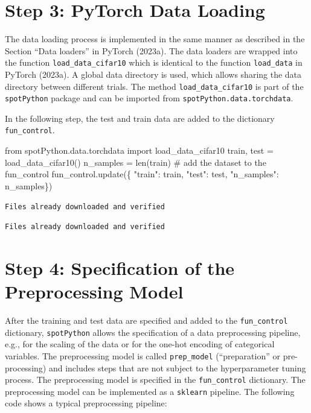 \documentclass[
  letterpaper,
  DIV=11,
  numbers=noendperiod]{scrreprt}
\newenvironment{Shaded}{\begin{snugshade}}{\end{snugshade}}
\newcommand{\BuiltInTok}[1]{\textcolor[rgb]{0.00,0.23,0.31}{#1}}
\newcommand{\CommentTok}[1]{\textcolor[rgb]{0.37,0.37,0.37}{#1}}
\newcommand{\ImportTok}[1]{\textcolor[rgb]{0.00,0.46,0.62}{#1}}
\newcommand{\NormalTok}[1]{\textcolor[rgb]{0.00,0.23,0.31}{#1}}
\newcommand{\OperatorTok}[1]{\textcolor[rgb]{0.37,0.37,0.37}{#1}}
\newcommand{\StringTok}[1]{\textcolor[rgb]{0.13,0.47,0.30}{#1}}
\begin{document}
\hypertarget{sec-data-loading-14}{%
\section{Step 3: PyTorch Data Loading}\label{sec-data-loading-14}}

The data loading process is implemented in the same manner as described
in the Section ``Data loaders'' in PyTorch (2023a). The data loaders are
wrapped into the function \texttt{load\_data\_cifar10} which is
identical to the function \texttt{load\_data} in PyTorch (2023a). A
global data directory is used, which allows sharing the data directory
between different trials. The method \texttt{load\_data\_cifar10} is
part of the \texttt{spotPython} package and can be imported from
\texttt{spotPython.data.torchdata}.

In the following step, the test and train data are added to the
dictionary \texttt{fun\_control}.

\begin{Shaded}
\begin{Highlighting}[]
\ImportTok{from}\NormalTok{ spotPython.data.torchdata }\ImportTok{import}\NormalTok{ load\_data\_cifar10}
\NormalTok{train, test }\OperatorTok{=}\NormalTok{ load\_data\_cifar10()}
\NormalTok{n\_samples }\OperatorTok{=} \BuiltInTok{len}\NormalTok{(train)}
\CommentTok{\# add the dataset to the fun\_control}
\NormalTok{fun\_control.update(\{}
    \StringTok{"train"}\NormalTok{: train,}
    \StringTok{"test"}\NormalTok{: test,}
    \StringTok{"n\_samples"}\NormalTok{: n\_samples\})}
\end{Highlighting}
\end{Shaded}

\begin{verbatim}
Files already downloaded and verified
\end{verbatim}

\begin{verbatim}
Files already downloaded and verified
\end{verbatim}

\hypertarget{sec-specification-of-preprocessing-model-14}{%
\section{Step 4: Specification of the Preprocessing
Model}\label{sec-specification-of-preprocessing-model-14}}

After the training and test data are specified and added to the
\texttt{fun\_control} dictionary, \texttt{spotPython} allows the
specification of a data preprocessing pipeline, e.g., for the scaling of
the data or for the one-hot encoding of categorical variables. The
preprocessing model is called \texttt{prep\_model} (``preparation'' or
pre-processing) and includes steps that are not subject to the
hyperparameter tuning process. The preprocessing model is specified in
the \texttt{fun\_control} dictionary. The preprocessing model can be
implemented as a \texttt{sklearn} pipeline. The following code shows a
typical preprocessing pipeline:
\end{document}

